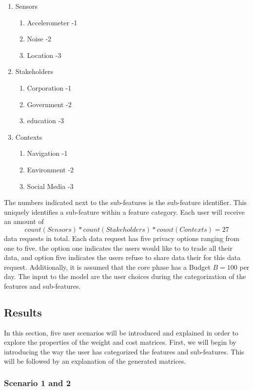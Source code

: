 \begin{enumerate}
    \item Sensors
    \begin{enumerate}
    \item Accelerometer -1
    \item Noise -2
    \item Location -3
   \end{enumerate}
    \item Stakeholders 
    \begin{enumerate}
    \item Corporation -1
    \item Government -2
    \item education -3
   \end{enumerate}
   \item Contexts
    \begin{enumerate}
    \item Navigation -1
    \item Environment -2
    \item Social Media -3
   \end{enumerate}
 \end{enumerate}
 
The numbers indicated next to the sub-features is the sub-feature identifier. This uniquely identifies a sub-feature within a feature category.
Each user will receive an amount of $$count(Sensors)*count(Stakeholders)*count(Contexts)=27$$ data requests in total. Each data request has five privacy options ranging from one to five. the option one indicates the users would like to to trade all their data, and option five indicates the users refuse to share data their for this data request. Additionally, it is assumed that the core phase has a Budget $B=100$ per day. 
The input to the model are the user choices during the categorization of the features and sub-features.

\subsection{Results}

In this section, five user scenarios will be introduced and explained in order to explore the properties of the weight and cost matrices.
First, we will begin by introducing the way the user has categorized the features and sub-features. This will be followed by an explanation
of the generated matrices.

\subsubsection{Scenario 1 and 2}

